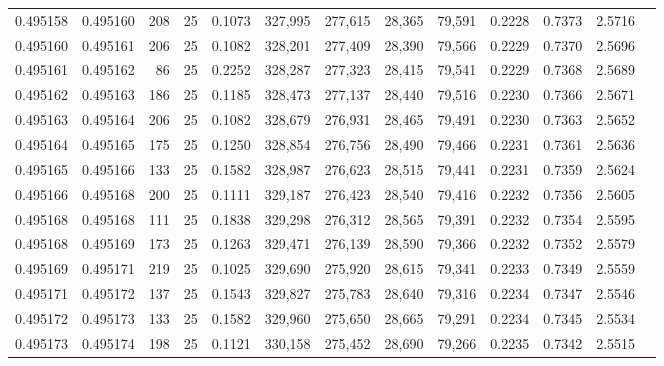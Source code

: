 \begin{tabular}{rrrrrrrrrrrrr}
0.495158 & 0.495160 &   208 &  25 &                                     0.1073 & 327,995 & 277,615 &  28,365 &  79,591 & 0.2228 & 0.7373 & 2.5716 \\
0.495160 & 0.495161 &   206 &  25 &                                     0.1082 & 328,201 & 277,409 &  28,390 &  79,566 & 0.2229 & 0.7370 & 2.5696 \\
0.495161 & 0.495162 &    86 &  25 &                                     0.2252 & 328,287 & 277,323 &  28,415 &  79,541 & 0.2229 & 0.7368 & 2.5689 \\
0.495162 & 0.495163 &   186 &  25 &                                     0.1185 & 328,473 & 277,137 &  28,440 &  79,516 & 0.2230 & 0.7366 & 2.5671 \\
0.495163 & 0.495164 &   206 &  25 &                                     0.1082 & 328,679 & 276,931 &  28,465 &  79,491 & 0.2230 & 0.7363 & 2.5652 \\
0.495164 & 0.495165 &   175 &  25 &                                     0.1250 & 328,854 & 276,756 &  28,490 &  79,466 & 0.2231 & 0.7361 & 2.5636 \\
0.495165 & 0.495166 &   133 &  25 &                                     0.1582 & 328,987 & 276,623 &  28,515 &  79,441 & 0.2231 & 0.7359 & 2.5624 \\
0.495166 & 0.495168 &   200 &  25 &                                     0.1111 & 329,187 & 276,423 &  28,540 &  79,416 & 0.2232 & 0.7356 & 2.5605 \\
0.495168 & 0.495168 &   111 &  25 &                                     0.1838 & 329,298 & 276,312 &  28,565 &  79,391 & 0.2232 & 0.7354 & 2.5595 \\
0.495168 & 0.495169 &   173 &  25 &                                     0.1263 & 329,471 & 276,139 &  28,590 &  79,366 & 0.2232 & 0.7352 & 2.5579 \\
0.495169 & 0.495171 &   219 &  25 &                                     0.1025 & 329,690 & 275,920 &  28,615 &  79,341 & 0.2233 & 0.7349 & 2.5559 \\
0.495171 & 0.495172 &   137 &  25 &                                     0.1543 & 329,827 & 275,783 &  28,640 &  79,316 & 0.2234 & 0.7347 & 2.5546 \\
0.495172 & 0.495173 &   133 &  25 &                                     0.1582 & 329,960 & 275,650 &  28,665 &  79,291 & 0.2234 & 0.7345 & 2.5534 \\
0.495173 & 0.495174 &   198 &  25 &                                     0.1121 & 330,158 & 275,452 &  28,690 &  79,266 & 0.2235 & 0.7342 & 2.5515 \\

\end{tabular}
